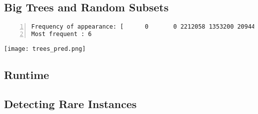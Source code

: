 \subsection{Big Trees and Random Subsets}
\begin{lstlisting}[language={},numbers=left,numberstyle=\tiny,frame=single,breaklines=true,postbreak=\mbox{\textcolor{red}{$\hookrightarrow$}\space}]
Frequency of appearance: [      0       0 2212058 1353200 2094475   22530 2690463  536110   91164]
Most frequent : 6
\end{lstlisting}

\texttt{[image: trees\_pred.png]}


\subsection{Runtime}
\subsection{Detecting Rare Instances}